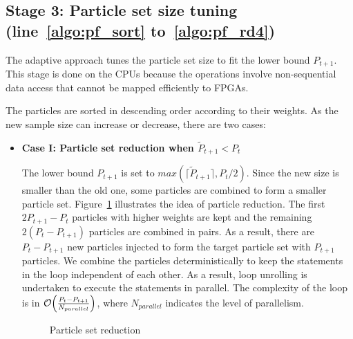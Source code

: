 \subsection{Stage 3: Particle set size tuning (line~\ref{algo:pf_sort} to~\ref{algo:pf_rd4})} 
The adaptive approach tunes the particle set size to fit the lower bound $P_{t+1}$.
This stage is done on the CPUs because the operations involve non-sequential data access that cannot be mapped efficiently to FPGAs.

The particles are sorted in descending order according to their weights.
As the new sample size can increase or decrease, there are two cases:

\begin{itemize}
\item {\bf Case I: Particle set reduction when $\widetilde{P}_{t+1} < P_{t}$} 

The lower bound $P_{t+1}$ is set to $max\left(\lceil\widetilde{P}_{t+1}\rceil, P_{t}/2\right)$.
Since the new size is smaller than the old one, some particles are combined to form a smaller particle set.
Figure~\ref{fig:tuning} illustrates the idea of particle reduction.
The first $2P_{t+1}-P_{t}$ particles with higher weights are kept and the remaining $2(P_{t}-P_{t+1})$ particles are combined in pairs.
As a result, there are $P_{t}-P_{t+1}$ new particles injected to form the target particle set with $P_{t+1}$ particles.
We combine the particles deterministically to keep the statements in the loop independent of each other.
As a result, loop unrolling is undertaken to execute the statements in parallel.
The complexity of the loop is in $\mathop{}\mathopen{}\mathcal{O}\mathopen{}\left(\frac{P_{t}-P_{t+1}}{N_{parallel}}\right)$, where $N_{parallel}$ indicates the level of parallelism.

\setcounter{subfigure}{0}
\begin{figure}[t!]
\centering
{}
\caption{Particle set reduction}
\label{fig:tuning}
\end{figure}


\end{itemize}
